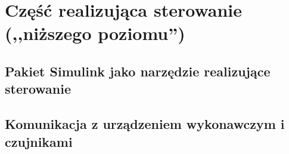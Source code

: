 \section{Część realizująca sterowanie (,,niższego poziomu'')}
\label{sec:czesc-nizsza}


\subsection{Pakiet Simulink jako narzędzie realizujące sterowanie}
\label{sub:czesc-nizsza-matlab}

\cite{Trawinski2011}


\subsection{Komunikacja z urządzeniem wykonawczym i czujnikami}
\label{sub:czesc-nizsza-komunikacja}
